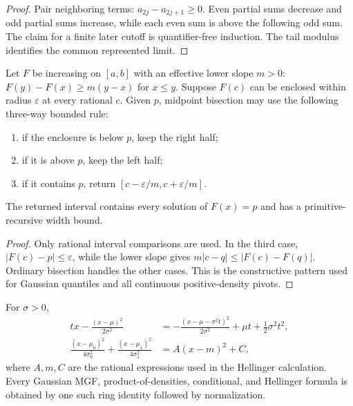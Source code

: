 \begin{proof}
Pair neighboring terms: $a_{2j}-a_{2j+1}\ge0$.  Even partial sums decrease and odd partial sums increase, while each even sum is above the following odd sum.  The claim for a finite later cutoff is quantifier-free induction.  The tail modulus identifies the common represented limit.
\end{proof}

\begin{lemma}\label{lem:robust-bisection}
Let $F$ be increasing on $[a,b]$ with an effective lower slope $m>0$:
$F(y)-F(x)\ge m(y-x)$ for $x\le y$.  Suppose $F(c)$ can be enclosed within radius $\varepsilon$ at every rational $c$.  Given $p$, midpoint bisection may use the following three-way bounded rule:
\begin{enumerate}[label=(\roman*)]
 \item if the enclosure is below $p$, keep the right half;
 \item if it is above $p$, keep the left half;
 \item if it contains $p$, return $[c-\varepsilon/m,c+\varepsilon/m]$.
\end{enumerate}
The returned interval contains every solution of $F(x)=p$ and has a primitive-recursive width bound.
\end{lemma}

\begin{proof}
Only rational interval comparisons are used.  In the third case,
$|F(c)-p|\le\varepsilon$, while the lower slope gives
$m|c-q|\le|F(c)-F(q)|$.  Ordinary bisection handles the other cases.  This is the constructive pattern used for Gaussian quantiles and all continuous positive-density pivots.
\end{proof}

\begin{lemma}\label{lem:complete-square}
For $\sigma>0$,
\begin{align*}
 tx-\frac{(x-\mu)^2}{2\sigma^2}
 &=-\frac{(x-\mu-\sigma^2t)^2}{2\sigma^2}
   +\mu t+\frac12\sigma^2t^2,\\
 \frac{(x-\mu_0)^2}{4\sigma_0^2}
 +\frac{(x-\mu_1)^2}{4\sigma_1^2}
 &=A(x-m)^2+C,
\end{align*}
where $A,m,C$ are the rational expressions used in the Hellinger calculation.  Every Gaussian MGF, product-of-densities, conditional, and Hellinger formula is obtained by one such ring identity followed by normalization.
\end{lemma}

